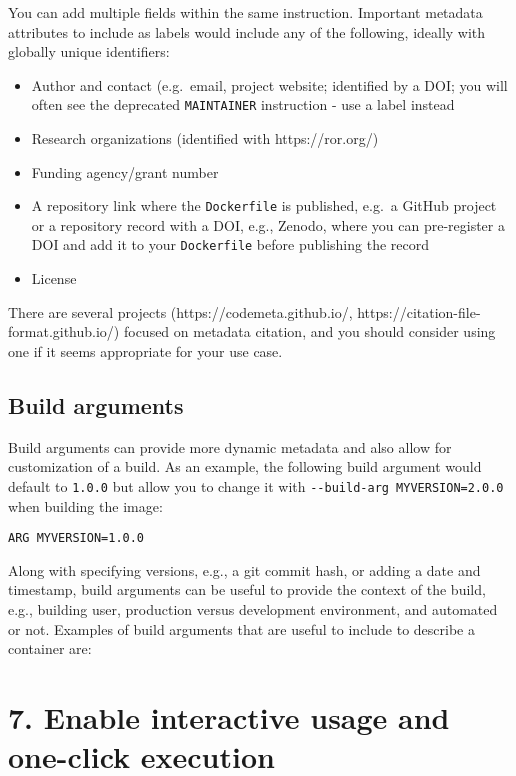 \documentclass[10pt,letterpaper]{article}
\providecommand{\tightlist}{%
  \setlength{\itemsep}{0pt}\setlength{\parskip}{0pt}}
\begin{document}
You can add multiple fields within the same instruction. Important
metadata attributes to include as labels would include any of the
following, ideally with globally unique identifiers:

\begin{itemize}
\tightlist
\item
  Author and contact (e.g.~email, project website; identified by a DOI;
  you will often see the deprecated \texttt{MAINTAINER} instruction -
  use a label instead
\item
  Research organizations (identified with https://ror.org/)
\item
  Funding agency/grant number
\item
  A repository link where the \texttt{Dockerfile} is published, e.g.~a
  GitHub project or a repository record with a DOI, e.g., Zenodo, where
  you can pre-register a DOI and add it to your \texttt{Dockerfile}
  before publishing the record
\item
  License
\end{itemize}

There are several projects (https://codemeta.github.io/,
https://citation-file-format.github.io/) focused on metadata citation,
and you should consider using one if it seems appropriate for your use
case.

\hypertarget{build-arguments}{%
\subsection{Build arguments}\label{build-arguments}}

Build arguments can provide more dynamic metadata and also allow for
customization of a build. As an example, the following build argument
would default to \texttt{1.0.0} but allow you to change it with
\texttt{-\/-build-arg\ MYVERSION=2.0.0} when building the image:

\begin{verbatim}
ARG MYVERSION=1.0.0
\end{verbatim}

Along with specifying versions, e.g., a git commit hash, or adding a
date and timestamp, build arguments can be useful to provide the context
of the build, e.g., building user, production versus development
environment, and automated or not. Examples of build arguments that are
useful to include to describe a container are:

\hypertarget{enable-interactive-usage-and-one-click-execution}{%
\section*{7. Enable interactive usage and one-click
execution}\label{enable-interactive-usage-and-one-click-execution}}
\end{document}
